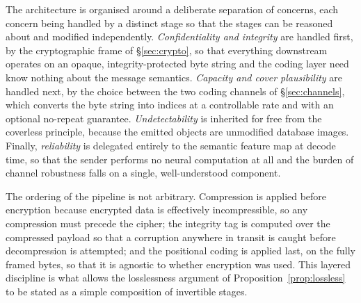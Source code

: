 \documentclass[11pt]{article}
\theoremstyle{definition}
\begin{document}
The architecture is organised around a deliberate separation of concerns, each
concern being handled by a distinct stage so that the stages can be reasoned about
and modified independently. \emph{Confidentiality and integrity} are handled first,
by the cryptographic frame of \S\ref{sec:crypto}, so that everything downstream
operates on an opaque, integrity-protected byte string and the coding layer need
know nothing about the message semantics. \emph{Capacity and cover plausibility}
are handled next, by the choice between the two coding channels of
\S\ref{sec:channels}, which converts the byte string into indices at a controllable
rate and with an optional no-repeat guarantee. \emph{Undetectability} is inherited
for free from the coverless principle, because the emitted objects are unmodified
database images. Finally, \emph{reliability} is delegated entirely to the semantic
feature map at decode time, so that the sender performs no neural computation at all
and the burden of channel robustness falls on a single, well-understood component.

The ordering of the pipeline is not arbitrary. Compression is applied before
encryption because encrypted data is effectively incompressible, so any compression
must precede the cipher; the integrity tag is computed over the compressed payload
so that a corruption anywhere in transit is caught before decompression is
attempted; and the positional coding is applied last, on the fully framed bytes, so
that it is agnostic to whether encryption was used. This layered discipline is what
allows the losslessness argument of Proposition~\ref{prop:lossless} to be stated as
a simple composition of invertible stages.
\end{document}
